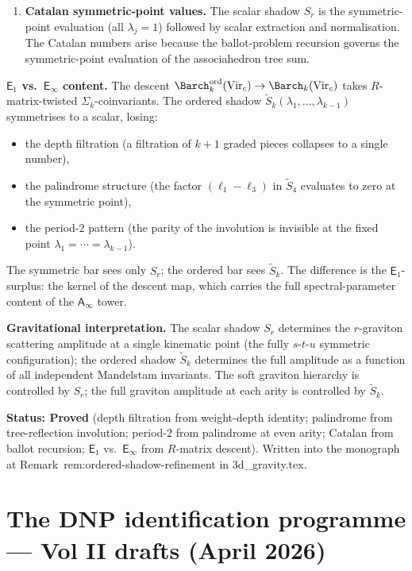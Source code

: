 \documentclass[11pt]{article}
\newcommand{\Eone}{\mathsf{E}_1}
\newcommand{\Einf}{\mathsf{E}_{\infty}}
\newcommand{\Ainf}{\mathsf{A}_{\infty}}
\begin{document}
\begin{enumerate}[label=\textbf{(\roman*)},leftmargin=2.5em]
\item \textbf{Catalan symmetric-point values.}
The scalar shadow $S_r$ is the symmetric-point evaluation
(all $\lambda_j = 1$) followed by scalar extraction and
normalisation.  The Catalan numbers arise because the
ballot-problem recursion governs the symmetric-point
evaluation of the associahedron tree sum.
\end{enumerate}

\medskip
\textbf{$\Eone$ vs.\ $\Einf$ content.}
The descent
$\Barch^{\mathrm{ord}}_k(\mathrm{Vir}_c) \to
\Barch_k(\mathrm{Vir}_c)$
takes $R$-matrix-twisted $\Sigma_k$-coinvariants.  The ordered
shadow $\widetilde{S}_k(\lambda_1, \ldots, \lambda_{k-1})$
symmetrises to a scalar, losing:
\begin{itemize}[nosep]
\item the depth filtration (a filtration of $k + 1$ graded pieces
  collapses to a single number),
\item the palindrome structure (the factor $(\ell_1 - \ell_3)$ in
  $\widetilde{S}_4$ evaluates to zero at the symmetric point),
\item the period-$2$ pattern (the parity of the involution is
  invisible at the fixed point $\lambda_1 = \cdots = \lambda_{k-1}$).
\end{itemize}
The symmetric bar sees only $S_r$; the ordered bar sees
$\widetilde{S}_k$.  The difference is the $\Eone$-surplus:
the kernel of the descent map, which carries the full
spectral-parameter content of the $\Ainf$ tower.

\medskip
\textbf{Gravitational interpretation.}
The scalar shadow $S_r$ determines the $r$-graviton scattering
amplitude at a single kinematic point (the fully $s$-$t$-$u$
symmetric configuration); the ordered shadow
$\widetilde{S}_k$ determines the full amplitude as a function
of all independent Mandelstam invariants.  The soft graviton
hierarchy is controlled by $S_r$; the full graviton amplitude
at each arity is controlled by $\widetilde{S}_k$.

\textbf{Status: Proved} (depth filtration from weight-depth
identity; palindrome from tree-reflection involution; period-$2$
from palindrome at even arity; Catalan from ballot recursion;
$\Eone$ vs.\ $\Einf$ from $R$-matrix descent).  Written into
the monograph at Remark~\textup{rem:ordered-shadow-refinement}
in 3d\_gravity.tex.


\section{The DNP identification programme --- Vol II drafts (April 2026)}
\label{sec:dnp-identification-vol2-drafts}
\end{document}
